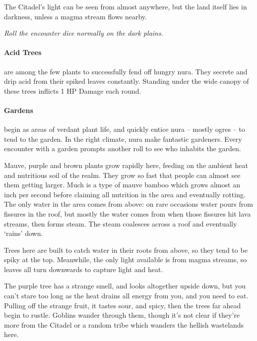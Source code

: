 \begin{multicols}{2}
The Citadel's light can be seen from almost anywhere, but the land itself lies in darkness, unless a magma stream flows nearby.

\textit{Roll the encounter dice normally on the dark plains.}

\paragraph{Acid Trees}
are among the few plants to successfully fend off hungry nura.
They secrete and drip acid from their spiked leaves constantly.
Standing under the wide canopy of these trees inflicts 1 HP Damage each round.

\paragraph{Gardens}
begin as areas of verdant plant life, and quickly entice nura -- mostly ogres -- to tend to the garden.
In the right climate, nura make fantastic gardeners.
Every encounter with a garden prompts another roll to see who inhabits the garden.

Mauve, purple and brown plants grow rapidly here, feeding on the ambient heat and nutritious soil of the realm.
They grow so fast that people can almost see them getting larger.
Much is a type of mauve bamboo which grows almost an inch per second before claiming all nutrition in the area and eventually rotting.
The only water in the area comes from above: on rare occasions water pours from fissures in the roof, but mostly the water comes from when those fissures hit lava streams, then forms steam.
The steam coalesces across a roof and eventually `rains' down.

Trees here are built to catch water in their roots from above, so they tend to be spiky at the top.
Meanwhile, the only light available is from magma streams, so leaves all turn downwards to capture light and heat.

\begin{boxtext}

  The purple tree has a strange smell, and looks altogether upside down, but you can't stare too long as the heat drains all energy from you, and you need to eat.
Pulling off the strange fruit, it tastes sour, and spicy, then the trees far ahead begin to rustle.
Goblins wander through them, though it's not clear if they're more from the Citadel or a random tribe which wanders the hellish wastelands here.

\end{boxtext}


\end{multicols}
